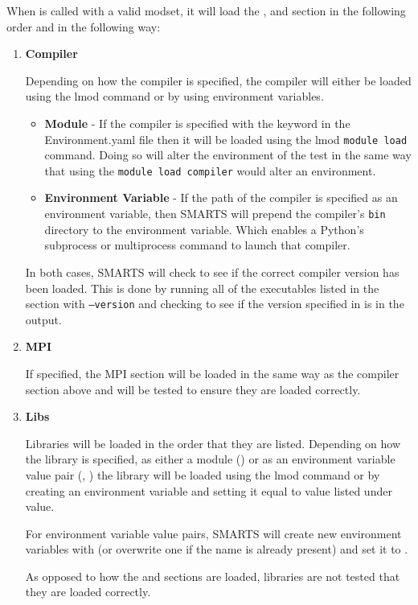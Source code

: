 When \loadModset is called with a valid modset, it will load the \compiler,
\mpi and \libs section in the following order and in the following way:

\begin{enumerate}
\item \textbf{Compiler}

Depending on how the compiler is specified, the compiler will either be loaded
using the lmod command or by using environment variables.
\begin{itemize}
    \item \textbf{Module} - If the compiler is specified with the \module
    keyword in the Environment.yaml file then it will be loaded using the lmod
    {\tt module load} command. Doing so will alter the environment of the test
    in the same way that using the {\tt module load compiler} would alter an
    environment.
    \item \textbf{Environment Variable} - If the path of the compiler is
    specified as an environment variable, then SMARTS will prepend the
    compiler's {\tt bin} directory to the \pathenv environment variable. Which
    enables a Python's subprocess or multiprocess command to launch that
    compiler.
\end{itemize}

In both cases, SMARTS will check to see if the correct compiler version
has been loaded. This is done by running all of the executables listed in the
\executables section with {\tt --version} and checking to see if the version
specified in \version is in the output.

\item \textbf{MPI}

If specified, the MPI section will be loaded in the same way as the compiler
section above and will be tested to ensure they are loaded correctly.

\item \textbf{Libs}

Libraries will be loaded in the order that they are listed. Depending on how
the library is specified, as either a module (\module) or as an environment
variable value pair (\name, \value) the library will be loaded using the lmod
command or by creating an environment variable and setting it equal to value
listed under value.

For environment variable value pairs, SMARTS will create new environment
variables with \name (or overwrite one if the name is already present) and set
it to \value.

As opposed to how the \compiler and \mpi sections are loaded, libraries are not
tested that they are loaded correctly.

\end{enumerate}
